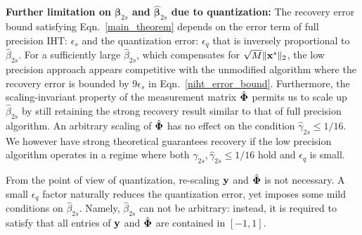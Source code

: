 \documentclass{article}
\begin{document}
\vspace{-.3em}

{\bf Further limitation on ${\boldsymbol{\beta}}_{2s}$ and $\hat{\boldsymbol{\beta}}_{2s}$ due to quantization:} The recovery error bound satisfying Eqn.~\ref{main_theorem} depends on the error term of full precision IHT: $ {\epsilon_s}$ and the quantization error: $ {\epsilon}_q$ that is inversely proportional to $\hat{\beta}_{2s}$. For a sufficiently large $\hat{\beta}_{2s}$, which compensates for $\sqrt{M} \|{\bf x}^s \|_2$, the low precision approach appears competitive with the unmodified algorithm where the recovery error is bounded by $9\epsilon_s$ in Eqn.~\ref{niht_error_bound}. Furthermore, the scaling-invariant property of the measurement matrix $\hat{\bf \Phi}$ permits us to scale up $\hat{\beta}_{2s}$ by still retaining the strong recovery result similar to that of full precision algorithm. An arbitrary scaling of $\hat{\bf \Phi}$ has no effect on the condition $\hat{\gamma}_{2s}\leq 1/16$. We however have strong theoretical guarantees recovery if the low precision algorithm operates in a regime where both ${\gamma}_{2s}, \hat{\gamma}_{2s}\leq 1/16$ hold and ${\epsilon}_q$ is small.
\vspace{-.3em}

From the  point of view of quantization, re-scaling ${\bf y}$ and $\hat{\bf \Phi}$ is not necessary. A small   ${\epsilon}_q$ factor naturally reduces the quantization error, yet imposes some mild conditions on $\hat{\beta}_{2s}$. Namely, $\hat{\beta}_{2s}$ can not be arbitrary: instead, it is required to satisfy that all entries of ${\bf y}$ and $\hat{\bf \Phi}$ are contained in $[-1, 1]$.
\vspace{-.3em}
\end{document}
